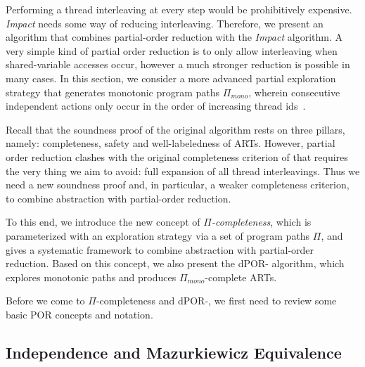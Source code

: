 \documentclass[conference]{IEEEtran}
\begin{document}
Performing a thread interleaving at every step would be prohibitively expensive.
\emph{Impact} needs some way of reducing interleaving.
Therefore, we present an algorithm that combines partial-order reduction with
the \emph{Impact} algorithm.  
A very simple kind of partial order reduction is to only allow interleaving
when shared-variable accesses occur, however a much stronger reduction is possible
in many cases.
In this section, we consider a more advanced partial exploration strategy
that generates monotonic program paths $\Pi_{\mathit{mono}}$, wherein consecutive independent
actions only occur in the order of increasing thread ids~\cite{DBLP:conf/tacas/WangYKG08}.

Recall that  the soundness proof of the original  algorithm 
rests on three pillars, namely: completeness, safety and well-labeledness of ARTs.
However, partial order reduction clashes
with the original completeness criterion of  that requires the very thing we aim to avoid:
full expansion of all thread interleavings.
Thus we need a new soundness proof and, in particular, a weaker completeness criterion, to combine abstraction with
partial-order reduction.  

To this end, we introduce the new concept of \mbox{\emph{$\Pi$-completeness}}, 
which is parameterized with an exploration strategy via a set of
program paths $\Pi$, and gives a systematic framework to combine
abstraction with partial-order reduction. 
Based on this concept, we also present the dPOR- algorithm, which
explores monotonic paths and produces $\Pi_{\mathit{mono}}$-complete ARTs.

Before we come to $\Pi$-completeness and dPOR-,
we first need to review some basic POR concepts and notation.

\subsection{Independence and Mazurkiewicz Equivalence}
\end{document}
